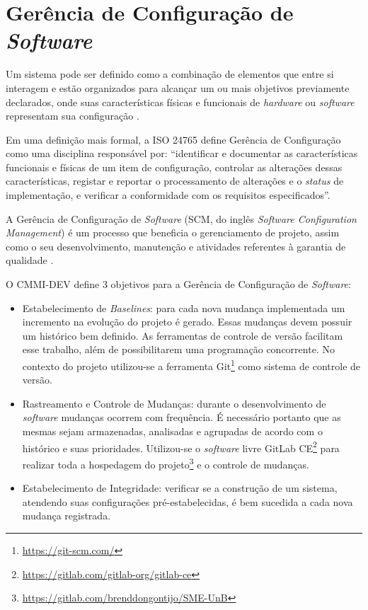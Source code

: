 \chapter{Gerência de Configuração de \textit{Software}}
Um sistema pode ser definido como a combinação de elementos que entre si interagem e estão organizados para alcançar um ou mais objetivos previamente declarados, onde suas características físicas e funcionais de \textit{hardware} ou \textit{software} representam sua configuração \cite{SWEBOK2014}.

Em uma definição mais formal, a ISO 24765 \cite{iso_24765} define Gerência de Configuração como uma disciplina responsável por: ``identificar e documentar as características funcionais e físicas de um item de configuração, controlar as alterações dessas características, registar e reportar o processamento de alterações e o \textit{status} de implementação, e verificar a conformidade com os requisitos especificados''.

A Gerência de Configuração de \textit{Software} (SCM, do inglês \textit{\textit{Software} Configuration Management}) é um processo que beneficia o gerenciamento de projeto, assim como o seu desenvolvimento, manutenção e atividades referentes à garantia de qualidade \cite{SWEBOK2014}.

O CMMI-DEV \cite{cmmi_dev} define 3 objetivos para a Gerência de Configuração de \textit{Software}:
\begin{itemize}
    \item Estabelecimento de \textit{Baselines}: para cada nova mudança implementada um incremento na evolução do projeto é gerado. Essas mudanças devem possuir um histórico bem definido. As ferramentas de controle de versão facilitam esse trabalho, além de possibilitarem uma programação concorrente. No contexto do projeto utilizou-se a ferramenta Git\footnote{\url{https://git-scm.com/}} como sistema de controle de versão.
    \item Rastreamento e Controle de Mudanças: durante o desenvolvimento de \textit{software} mudanças ocorrem com frequência. É necessário portanto que as mesmas sejam armazenadas, analisadas e agrupadas de acordo com o histórico e suas prioridades. Utilizou-se o \textit{software} livre GitLab CE\footnote{\url{https://gitlab.com/gitlab-org/gitlab-ce}} para realizar toda a hospedagem do projeto\footnote{\url{https://gitlab.com/brenddongontijo/SME-UnB}} e o controle de mudanças.
    \item Estabelecimento de Integridade: verificar se a construção de um sistema, atendendo suas configurações pré-estabelecidas, é bem sucedida a cada nova mudança registrada.
\end{itemize}